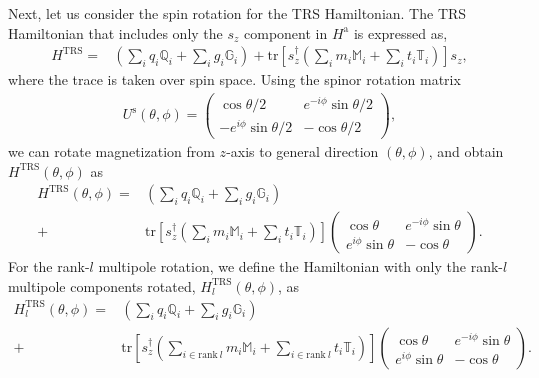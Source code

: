 \documentclass[preprint,12pt]{elsarticle}
\begin{document}
Next, let us consider the spin rotation for the TRS Hamiltonian.
The TRS Hamiltonian that includes only the $s_z$ component in
$H^{\mathrm{a}}$ is expressed as,
\begin{align}
  H^{\mathrm{TRS}}
  = & \left( \sum_{i} q_i \mathbb{Q}_i + \sum_{i} g_i \mathbb{G}_i \right)
  +\mathrm{tr}\left[s_z^\dagger \left( \sum_{i} m_i \mathbb{M}_i +
  \sum_{i} t_i \mathbb{T}_i \right) \right] s_z, \label{eq:ham_trs}
\end{align}
where the trace is taken over spin space.
Using the spinor rotation matrix
\begin{align}
  U^{\mathrm{s}}(\theta, \phi) =
  \begin{pmatrix}
    \cos \theta/2            & e^{-i\phi} \sin \theta/2 \\
    -e^{i\phi} \sin \theta/2 & -\cos \theta/2
  \end{pmatrix},
\end{align}
we can rotate magnetization from $z$-axis to general direction
$(\theta, \phi)$, and  obtain $H^{\mathrm{TRS}}(\theta, \phi)$ as
\begin{align}
  H^{\mathrm{TRS}} (\theta, \phi)
  = & \left( \sum_{i} q_i \mathbb{Q}_i + \sum_{i} g_i \mathbb{G}_i
  \right) \nonumber\\
  + & \mathrm{tr}\left[s_z^\dagger \left( \sum_{i} m_i \mathbb{M}_i +
  \sum_{i} t_i \mathbb{T}_i \right) \right]
  \begin{pmatrix}
    \cos\theta           & e^{-i\phi} \sin\theta \\
    e^{i\phi} \sin\theta & -\cos\theta
  \end{pmatrix}.
\end{align}
For the rank-\(l\) multipole rotation, we define the Hamiltonian with
only the rank-\(l\) multipole components rotated,
\(H^{\mathrm{TRS}}_{l}(\theta,\phi)\), as
\begin{align}
  H^{\mathrm{TRS}}_{l}(\theta, \phi)
  = & \left( \sum_{i} q_i \mathbb{Q}_i + \sum_{i} g_i \mathbb{G}_i
  \right) \nonumber \\
  + & \mathrm{tr}\left[s_z^\dagger \left( \sum_{i \in \mathrm{rank}~l}
      m_i \mathbb{M}_i
  + \sum_{i \in \mathrm{rank}~l} t_i \mathbb{T}_i \right) \right]
  \begin{pmatrix}
    \cos\theta           & e^{-i\phi} \sin\theta \\
    e^{i\phi} \sin\theta & -\cos\theta
  \end{pmatrix}.
\end{align}
\end{document}
